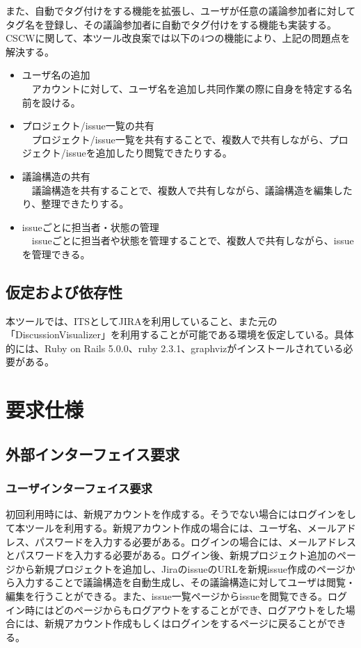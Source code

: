 \documentclass[12pt, oneside]{jreport}
\begin{document}
	また、自動でタグ付けをする機能を拡張し、ユーザが任意の議論参加者に対してタグ名を登録し、その議論参加者に自動でタグ付けをする機能も実装する。
	\\
	
	CSCWに関して、本ツール改良案では以下の4つの機能により、上記の問題点を解決する。
	\begin{itemize}
		\item ユーザ名の追加
		\\
		　アカウントに対して、ユーザ名を追加し共同作業の際に自身を特定する名前を設ける。
		\item プロジェクト/issue一覧の共有
		\\
		　プロジェクト/issue一覧を共有することで、複数人で共有しながら、プロジェクト/issueを追加したり閲覧できたりする。
		\item 議論構造の共有
		\\
		　議論構造を共有することで、複数人で共有しながら、議論構造を編集したり、整理できたりする。
		\item issueごとに担当者・状態の管理
		\\
		　issueごとに担当者や状態を管理することで、複数人で共有しながら、issueを管理できる。
	\end{itemize}

	\section{仮定および依存性}
	本ツールでは、ITSとしてJIRAを利用していること、また元の「DiscussionVisualizer」を利用することが可能である環境を仮定している。具体的には、Ruby on Rails 5.0.0、ruby 2.3.1、graphvizがインストールされている必要がある。

\chapter{要求仕様}

	\section{外部インターフェイス要求}
		
		\subsection{ユーザインターフェイス要求}

		初回利用時には、新規アカウントを作成する。そうでない場合にはログインをして本ツールを利用する。新規アカウント作成の場合には、ユーザ名、メールアドレス、パスワードを入力する必要がある。ログインの場合には、メールアドレスとパスワードを入力する必要がある。ログイン後、新規プロジェクト追加のページから新規プロジェクトを追加し、JiraのissueのURLを新規issue作成のページから入力することで議論構造を自動生成し、その議論構造に対してユーザは閲覧・編集を行うことができる。また、issue一覧ページからissueを閲覧できる。ログイン時にはどのページからもログアウトをすることができ、ログアウトをした場合には、新規アカウント作成もしくはログインをするページに戻ることができる。
\end{document}
